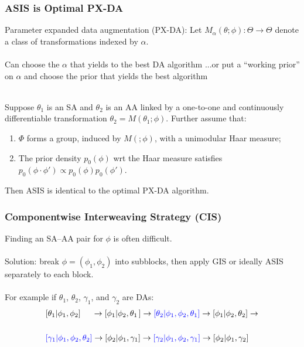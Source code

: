 \documentclass[xcolor=dvipsnames]{beamer}
\begin{document}
\begin{frame}
\frametitle{ASIS is Optimal PX-DA}
Parameter expanded data augmentation (PX-DA): Let $M_\alpha(\theta;\phi):\Theta\to\Theta$ denote a class of transformations indexed by $\alpha$.\\~\\

Can choose the $\alpha$ that yields to the best DA algorithm \citep{meng1999seeking}...\pause or put a ``working prior'' on $\alpha$ and choose the prior that yields the best algorithm \citep{meng1999seeking,liu1999parameter}\\~\\


\begin{theorem}
Suppose $\theta_1$ is an SA and $\theta_2$ is an AA linked by a one-to-one and continuously differentiable transformation $\theta_2=M(\theta_1;\phi)$. Further assume that:
\begin{enumerate}
\item $\Phi$ forms a group, induced by $M(;\phi)$, with a unimodular Haar measure;
\item The prior density $p_0(\phi)$ wrt the Haar measure satisfies $p_0(\phi\cdot\phi')\propto p_0(\phi)p_0(\phi')$.
\end{enumerate}
Then ASIS is identical to the optimal PX-DA algorithm.
\end{theorem}
\end{frame}

\begin{frame}
\frametitle{Componentwise Interweaving Strategy (CIS)}
Finding an SA--AA pair for $\phi$ is often difficult.\\~\\

Solution: break $\phi=(\phi_1,\phi_2)$ into subblocks, then apply GIS or ideally ASIS separately to each block.\\~\\

For example if $\theta_1$, $\theta_2$, $\gamma_1$, and $\gamma_2$ are DAs:\\

\begin{align*}
&[\theta_1|\phi_1,\phi_2]\phantom{\theta_2,}\hspace{.06cm} \to [\phi_1|\phi_2,\theta_1\hspace{.05cm}] \to {\color{blue}[\theta_2|\phi_1,\phi_2,\theta_1]} \to [\phi_1|\phi_2,\theta_2]\to\\
&\\
&{\color{blue}[\gamma_1|\phi_1,\phi_2,\theta_2]} \to [\phi_2|\phi_1,\gamma_1] \to {\color{blue}[\gamma_2|\phi_1,\phi_2,\gamma_1]} \to [\phi_2|\phi_1,\gamma_2]\\
\end{align*}

\end{frame}
\end{document}

